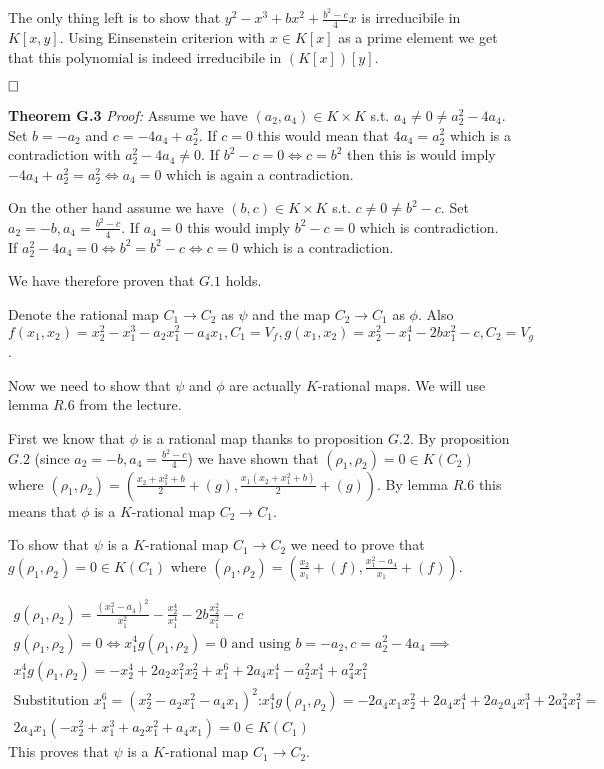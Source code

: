 \documentclass[12pt, a4paper]{article}
\newcommand{\qed}{\hfill\square}
\begin{document}
The only thing left is to show that $y^2-x^3+bx^2+\frac{b^2-c}{4}x$ is irreducibile in $K[x,y]$. Using Einsenstein criterion with $x \in K[x]$ as a prime element we get that this polynomial is indeed irreducibile in $(K[x])[y]$.

$\qed$

\textbf{Theorem G.3} \textit{Proof:}
Assume we have $(a_2, a_4) \in K \times K$ s.t. $a_4 \neq 0 \neq a_2^2-4a_4$. Set $b = -a_2$ and $c = -4a_4+a_2^2$. If $c = 0$ this would mean that $4a_4=a_2^2$ which is a contradiction with $a_2^2-4a_4 \neq 0$. If $b^2-c=0 \iff c=b^2$ then this is would imply $-4a_4+a_2^2 = a_2^2 \iff a_4 = 0$ which is again a contradiction.

On the other hand assume we have $(b,c) \in K \times K$ s.t. $c \neq 0 \neq b^2-c$. Set $a_2 = -b, a_4 = \frac{b^2-c}{4}$. If $a_4 = 0$ this would imply $b^2-c = 0$ which is contradiction. If $a_2^2-4a_4 =0 \iff b^2=b^2-c \iff c = 0$ which is a contradiction.

We have therefore proven that $G.1$ holds.

Denote the rational map $C_1 \rightarrow C_2$ as $\psi$ and the map $C_2 \rightarrow C_1$ as $\phi$. Also $f(x_1,x_2) = x_2^2-x_1^3-a_2x_1^2-a_4x_1, C_1 = V_{f}, g(x_1,x_2) = x_2^2-x_1^4-2bx_1^2-c, C_2 = V_g$.

Now we need to show that $\psi$ and $\phi$ are actually $K$-rational maps. We will use lemma $R.6$ from the lecture. 

First we know that $\phi$ is a rational map thanks to proposition $G.2$. By proposition $G.2$ (since $a_2 = -b, a_4 = \frac{b^2-c}{4}$) we have shown that $(\rho_1,\rho_2) = 0 \in K(C_2)$ where $(\rho_1,\rho_2) = \left(\frac{x_2+x_1^2+b}{2} + (g), \frac{x_1(x_2+x_1^2+b)}{2} + (g)\right)$. By lemma $R.6$ this means that $\phi$ is a $K$-rational map $C_2 \rightarrow C_1$.

To show that $\psi$ is a $K$-rational map $C_1 \rightarrow C_2$ we need to prove that $g(\rho_1, \rho_2) = 0 \in K(C_1)$ where $(\rho_1, \rho_2) = \left( \frac{x_2}{x_1} + (f), \frac{x_1^2-a_4}{x_1} + (f)\right)$.

\begin{gather*}
g(\rho_1, \rho_2) = \frac{(x_1^2-a_4)^2}{x_1^2} - \frac{x_2^4}{x_1^4} - 2b\frac{x_2^2}{x_1^2} - c\\
g(\rho_1, \rho_2) = 0 \iff x_1^4g(\rho_1, \rho_2) = 0 \text{ and using $b=-a_2, c = a_2^2-4a_4$}\implies\\
x_1^4g(\rho_1, \rho_2) = -x_2^4 + 2a_2x_1^2x_2^2+x_1^6+2a_4x_1^4-a_2^2x_1^4+a_4^2x_1^2\\
\text{Substitution $x_1^6 = (x_2^2-a_2x_1^2-a_4x_1)^2$:}
x_1^4g(\rho_1, \rho_2) = -2a_4x_1x_2^2+2a_4x_1^4+2a_2a_4x_1^3+2a_4^2x_1^2 = \\
2a_4x_1(-x_2^2+x_1^3+a_2x_1^2+a_4x_1) = 0 \in K(C_1)
\end{gather*}
This proves that $\psi$ is a $K$-rational map $C_1 \rightarrow C_2$.
\end{document}
